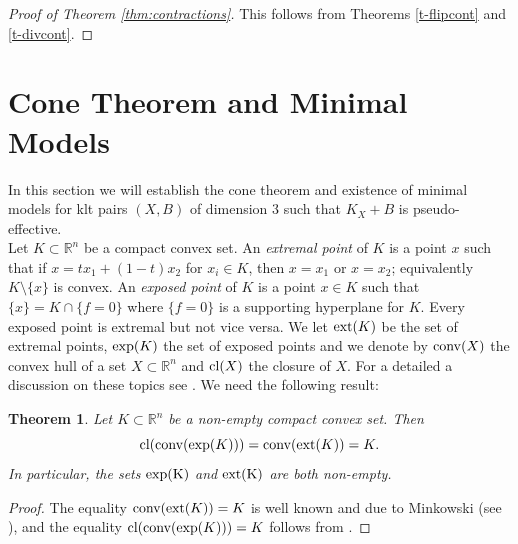 \documentclass[12pt]{amsart}
\theoremstyle{plain}
\newtheorem{theorem}{Theorem}[section]
\theoremstyle{remark}
\theoremstyle{definition}
\newcommand{\<}{\leq}
\newcommand{\R}{{\mathbb{R}}}
\theoremstyle{definition}
\theoremstyle{definition}
\numberwithin{equation}{section}
\theoremstyle{remark}
\begin{document}
\begin{proof}[Proof of Theorem \ref{thm:contractions}]
This follows from Theorems \ref{t-flipcont} and \ref{t-divcont}.
\end{proof}

\section{Cone Theorem and Minimal Models}\label{sec:cone-and-mm}
In this section we will establish the cone theorem and existence of minimal models for klt pairs $(X, B)$ of dimension $3$ such that $K_X+B$ is pseudo-effective.\\ 


Let $K\subset \R ^n$ be a compact convex set. An \textit{extremal point} of $K$ is a point  $x$ such that if $x=tx_1+(1-t)x_2$ for $x_i\in K$, then $x=x_1$ or $x=x_2$; equivalently $K\setminus \{x\}$ is convex. An \textit{exposed point} of $K$ is a point $x\in K$ such that $\{x\}=K\cap \{f=0\}$ where $\{f=0\}$ is a supporting hyperplane for $K$. Every exposed point is extremal but not vice versa. We let ${\rm ext}(K)$ be the set of extremal points, ${\rm exp}(K)$ the set of exposed points and we denote by ${\rm conv}(X)$ the convex hull of a set $X\subset \R ^n$ and ${\rm cl}(X)$ the closure of $X$. For a detailed a discussion on these topics see \cite[Chapter 1]{HW20}. We need the following result:
\begin{theorem}\label{t-conv}    Let $K\subset \R ^n$ be a non-empty compact convex set. Then
\[{\rm cl(conv(exp}(K)))={\rm conv( ext}(K))=K.\]  
In particular, the sets ${\rm exp(K)}$ and ${\rm ext(K)}$ are both non-empty.
\end{theorem}

\begin{proof}
    The equality ${\rm conv( ext}(K))=K$ is well known and due to Minkowski (see \cite[Theorem 1.21]{HW20}), and the equality ${\rm cl(conv(exp}(K)))=K$ follows from \cite[Theorem 1.23]{HW20}.
    \end{proof}
    
\end{document}
